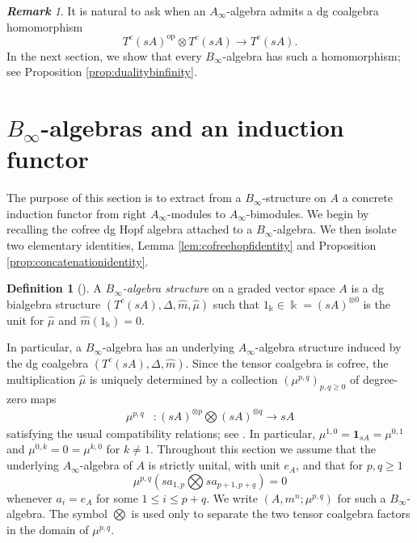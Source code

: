 \documentclass[a4paper, 11pt]{amsart}
\theoremstyle{definition}
\newtheorem{defn}[thm]{Definition}
\theoremstyle{remark}
\newtheorem{rem}[thm]{\bf Remark}
\numberwithin{equation}{section}
\newcommand{\op}{\mathrm{op}}
\begin{document}
\begin{rem}\label{rem:question}
It is natural to ask when an $A_\infty$-algebra admits a dg coalgebra homomorphism
\[
T^c(sA)^{\op}\otimes T^c(sA)\longrightarrow T^c(sA).
\]
In the next section, we show that every $B_\infty$-algebra has such a homomorphism; see Proposition \ref{prop:dualitybinfinity}.
 \end{rem}





\section{\texorpdfstring{$B_{\infty}$}{}-algebras and an induction functor}\label{section:Binfinity}

The purpose of this section is to extract from a $B_\infty$-structure on $A$ a concrete induction functor from right $A_\infty$-modules to $A_\infty$-bimodules. We begin by recalling the cofree dg Hopf algebra attached to a $B_\infty$-algebra. We then isolate two elementary identities, Lemma \ref{lem:cofreehopfidentity} and Proposition \ref{prop:concatenationidentity}. 



\begin{defn}[{\cite[Definition 5.2]{GJ}}]
A {\it $B_{\infty}$-algebra structure} on a graded vector space $A$ is a dg bialgebra structure $(T^c(sA), \Delta, \widehat{m}, \widehat{\mu})$ such that $1_\Bbbk \in \Bbbk = (sA)^{\otimes 0}$ is the unit for $\widehat{\mu}$ and $\widehat{m}(1_\Bbbk)=0$.
\end{defn}

In particular, a $B_{\infty}$-algebra has an underlying $A_{\infty}$-algebra structure induced by the dg coalgebra $(T^c(sA),\Delta,\widehat m)$.
Since the tensor coalgebra is cofree, the multiplication $\widehat{\mu}$ is uniquely determined by a collection $(\mu^{p,q})_{p,q\geq 0}$ of degree-zero maps
\begin{align*}
\mu^{p, q} & \colon (sA)^{\otimes p} \bigotimes (sA)^{\otimes q} \to sA
\end{align*}
satisfying the usual compatibility relations; see \cite[Subsection 2.2]{Vor}.
In particular, $\mu^{1,0}=\mathbf{1}_{sA}=\mu^{0,1}$ and $\mu^{0,k}=0=\mu^{k,0}$ for $k\neq 1$.
Throughout this section we assume that the underlying $A_\infty$-algebra of $A$ is strictly unital, with unit $e_A$, and that for $p,q\geq 1$
\[
\mu^{p,q}(sa_{1,p}\bigotimes sa_{p+1,p+q})=0
\]
whenever $a_i=e_A$ for some $1\leq i\leq p+q$. We write $(A,m^n;\mu^{p,q})$ for such a $B_\infty$-algebra. The symbol $\bigotimes$ is used only to separate the two tensor coalgebra factors in the domain of $\mu^{p,q}$.
\end{document}
